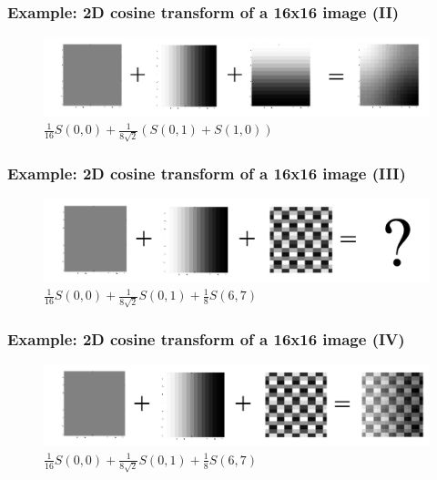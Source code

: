 \documentclass{beamer}
\begin{document}
\begin{frame}
\frametitle{Example: 2D cosine transform of a 16x16 image (II)}
\begin{figure}[H]
  \includegraphics[width=  \textwidth]{Ex_BasisImages2} 
  \caption{$\frac{1}{16}S(0,0) + \frac{1}{8 \sqrt{2}}(S(0,1) + S(1,0))$}
\end{figure} 
\end{frame}


\begin{frame}
\frametitle{Example: 2D cosine transform of a 16x16 image (III)}
\begin{figure}[H]
  \includegraphics[width=  0.7 \textwidth]{Ex_BasisImages3} 
  \caption{$\frac{1}{16}S(0,0) + \frac{1}{8\sqrt{2}}S(0,1) + \frac{1}{8}S(6,7)$}
\end{figure} 
\end{frame}

\begin{frame}
\frametitle{Example: 2D cosine transform of a 16x16 image (IV)}
\begin{figure}[H]
  \includegraphics[width=  0.7 \textwidth]{Ex_BasisImages4} 
  \caption{$\frac{1}{16}S(0,0) + \frac{1}{8\sqrt{2}}S(0,1) + \frac{1}{8}S(6,7)$}
\end{figure} 
\end{frame}
\end{document}
